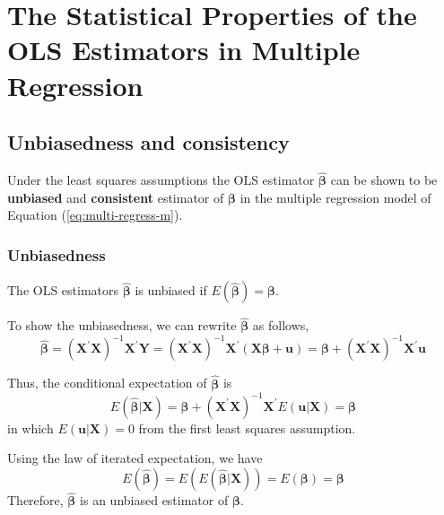 \documentclass[a4paper,11pt]{article}
\begin{document}
\section{The Statistical Properties of the OLS Estimators in Multiple Regression}
\label{sec:org4f616fd}

\subsection{Unbiasedness and consistency}
\label{sec:org6d76e79}

Under the least squares assumptions the OLS estimator
\(\hat{\boldsymbol{\beta}}\) can be shown to be \textbf{unbiased} and
\textbf{consistent} estimator of \(\boldsymbol{\beta}\) in the multiple
regression model of Equation (\ref{eq:multi-regress-m}).

\subsubsection*{Unbiasedness}
\label{sec:orged680a3}

The OLS estimators \(\hat{\boldsymbol{\beta}}\) is unbiased if
\(E(\hat{\boldsymbol{\beta}}) = \boldsymbol{\beta}\).

To show the unbiasedness, we can rewrite \(\hat{\boldsymbol{\beta}}\) as
follows,
\begin{equation}
\label{eq:bhat-m-a}
\hat{\boldsymbol{\beta}} = \left(\mathbf{X}^{\prime} \mathbf{X}\right)^{-1} \mathbf{X}^{\prime} \mathbf{Y}
= \left(\mathbf{X}^{\prime} \mathbf{X} \right)^{-1} \mathbf{X}^{\prime} (\mathbf{X} \boldsymbol{\beta} + \mathbf{u})
= \boldsymbol{\beta} + \left(\mathbf{X}^{\prime} \mathbf{X}\right)^{-1} \mathbf{X}^{\prime} \mathbf{u}
\end{equation}

Thus, the conditional expectation of \(\hat{\boldsymbol{\beta}}\) is
\begin{equation}
\label{eq:bhat-unbias}
E(\hat{\boldsymbol{\beta}} | \mathbf{X}) = \boldsymbol{\beta} + \left(\mathbf{X}^{\prime} \mathbf{X}\right)^{-1} \mathbf{X}^{\prime} E(\mathbf{u} | \mathbf{X}) = \boldsymbol{\beta}
\end{equation}
in which \(E(\mathbf{u} | \mathbf{X}) = 0\) from the first least squares
assumption.

Using the law of iterated expectation, we have
\[ E(\hat{\boldsymbol{\beta}}) = E(E(\hat{\boldsymbol{\beta}} |
\mathbf{X})) = E(\boldsymbol{\beta}) = \boldsymbol{\beta} \]
Therefore, \(\hat{\boldsymbol{\beta}}\) is an unbiased estimator of
\(\boldsymbol{\beta}\).
\end{document}
